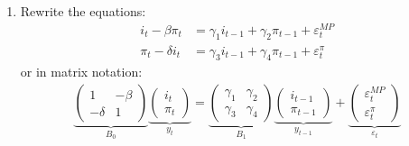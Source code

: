 \begin{enumerate}

\item
Rewrite the equations:
\begin{align*}
i_t - \beta \pi_t  &=  \gamma_1 i_{t-1} + \gamma_2 \pi_{t-1} + \varepsilon_t^{MP}
\\
\pi_t - \delta i_t &=  \gamma_3 i_{t-1} + \gamma_4 \pi_{t-1} + \varepsilon_t^{\pi}
\end{align*}
or in matrix notation:
\begin{align*}
\underbrace{\begin{pmatrix} 1 & -\beta \\ -\delta & 1 \end{pmatrix}}_{B_0}
\underbrace{\begin{pmatrix} i_t \\ \pi_t \end{pmatrix}}_{y_t}
=
\underbrace{\begin{pmatrix} \gamma_1 & \gamma_2 \\ \gamma_3 & \gamma_4 \end{pmatrix}}_{B_1}
\underbrace{\begin{pmatrix} i_{t-1} \\ \pi_{t-1} \end{pmatrix}}_{y_{t-1}}
+
\underbrace{\begin{pmatrix} \varepsilon_t^{MP} \\ \varepsilon_t^{\pi} \end{pmatrix}}_{\varepsilon_t}
\end{align*}


\end{enumerate}
